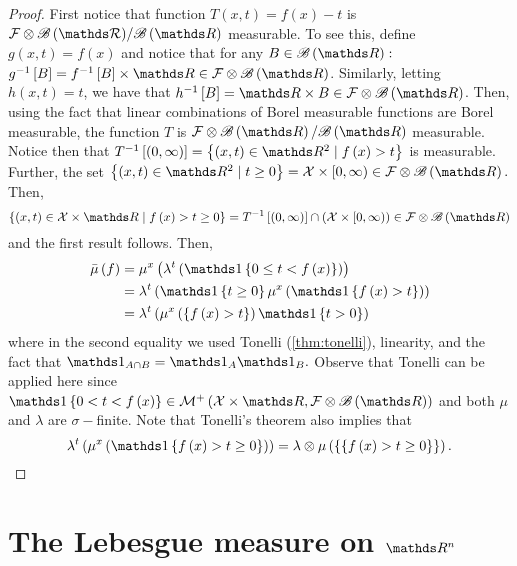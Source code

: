 \begin{proof}
First notice that function $T\left(x,t\right)=f\left(x\right)-t$
is $\F\otimes\mathcal{\borel\left(\R\right)}/\borel\left(\R\right)$
measurable. To see this, define $g\left(x,t\right)=f\left(x\right)$
and notice that for any $B\in\borel\left(\R\right):$$g^{-1}\left[B\right]=f^{-1}\left[B\right]\times\R\in\mathcal{F}\otimes\borel\left(\R\right)$.
Similarly, letting $h\left(x,t\right)=t$, we have that $h^{-1}\left[B\right]=\R\times B\in\F\otimes\borel\left(\R\right)$.
Then, using the fact that linear combinations of Borel measurable
functions are Borel measurable, the function $T$ is $\F\otimes\borel\left(\R\right)/\borel\left(\R\right)$
measurable. Notice then that $T^{-1}\left[\left(0,\infty\right)\right]=\left\{ \left(x,t\right)\in\R^{2}\mid f\left(x\right)>t\right\} $
is measurable. Further, the set $\left\{ \left(x,t\right)\in\R^{2}\mid t\geq0\right\} =\X\times\left[0,\infty\right)\in\F\otimes\borel\left(\R\right).$
Then, 
\[
\left\{ \left(x,t\right)\in\X\times\R\mid f\left(x\right)>t\geq0\right\} =T^{-1}\left[\left(0,\infty\right)\right]\cap\left(\X\times\left[0,\infty\right)\right)\in\F\otimes\borel\left(\R\right)
\]
and the first result follows. Then,
\begin{align*}
\lebInt{\mu}f & =\mu^{x}\left(\lambda^{t}\left(\indicate\left\{ 0\le t<f\left(x\right)\right\} \right)\right)\\
 & =\lambda^{t}\left(\indicate\left\{ t\geq0\right\} \mu^{x}\left(\indicate\left\{ f\left(x\right)>t\right\} \right)\right)\\
 & =\lambda^{t}\left(\mu^{x}\left(\left\{ f\left(x\right)>t\right\} \right)\indicate\left\{ t>0\right\} \right)
\end{align*}
where in the second equality we used Tonelli (\ref{thm:tonelli}),
linearity, and the fact that $\indicate_{A\cap B}=\indicate_{A}\indicate_{B}.$
Observe that Tonelli can be applied here since $\indicate\left\{ 0<t<f\left(x\right)\right\} \in\mathcal{M}^{+}\left(\X\times\R,\mathcal{F}\otimes\borel\left(\R\right)\right)$
and both $\mu$ and $\lambda$ are $\sigma-$finite. Note that Tonelli's
theorem also implies that 
\[
\lambda^{t}\left(\mu^{x}\left(\indicate\left\{ f\left(x\right)>t\geq0\right\} \right)\right)=\lambda\otimes\mu\left(\left\{ \left\{ f\left(x\right)>t\geq0\right\} \right\} \right).
\]
\end{proof}


\section{The Lebesgue measure on $\protect\R^{n}$}

